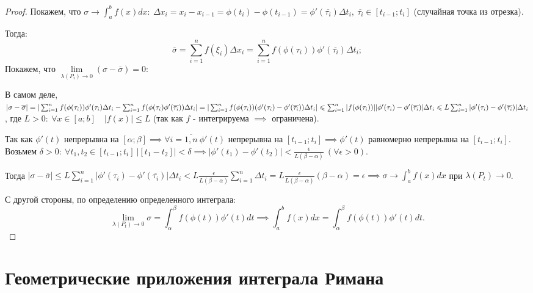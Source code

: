 \documentclass{report}
\theoremstyle{definition}
\begin{document}
\begin{proof}
  Покажем, что $\sigma \rightarrow \int_{a}^{b}f(x)dx: \ \Delta x_i = x_i - x_{i-1} = \phi(t_i)
    - \phi (t_{i-1}) = \phi'(\overline{\tau_i})\Delta t_i, \ \overline{\tau_i} \in [t_{i-1};t_i]$
  (случайная точка из отрезка).

  Тогда:
  \begin{equation*}
    \overline{\sigma} = \sum_{i=1}^{n}f(\xi_i)\Delta x_i = \sum_{i=1}^{n}f(\phi(\tau_i))
    \phi'(\overline{\tau_i})\Delta t_i;
  \end{equation*}
  Покажем, что $\underset{\lambda(P_i)\rightarrow0}{\lim}(\sigma - \overline{\sigma}) = 0:$

  В самом деле, $| \sigma - \overline{\sigma} | = | \sum_{i=1}^{n} f(\phi(\tau_i))\phi'(\tau_i)
    \Delta t_i - \sum_{i=1}^{n}f(\phi(\tau_i)\phi'(\overline{\tau_i}))\Delta t_i | =
    | \sum_{i=1}^{n}f(\phi(\tau_i))(\phi'(\tau_i) - \phi'(\overline{\tau_i}))\Delta t_i | \leqslant
    \sum_{i=1}^{n}| f(\phi(\tau_i)) | | \phi'(\tau_i) - \phi'(\overline{\tau_i}) |\Delta t_i \leqslant
    \\ L\sum_{i=1}^{n}| \phi'(\tau_i) - \phi'(\overline{\tau_i}) | \Delta t_i$, где $L>0: \ \forall x
    \in [a;b] \quad |f(x)| \leqslant L$ (так как $f$ - интегрируема $\implies$ ограничена).

  Так как $\phi'(t)$ непрерывна на $[\alpha;\beta] \implies \forall i = \overline{1,n} \
    \phi'(t)$ непрерывна на $[t_{i-1}; t_i] \implies \phi'(t)$ равномерно непрерывна на $[t_{i-1}; t_i]$.
  Возьмем $\delta > 0 : \ \forall t_1, t_2 \in [t_{i-1}; t_i] \ | [t_1 - t_2] | < \delta \implies
    | \phi'(t_1) - \phi'(t_2) | < \frac{\epsilon}{L(\beta - \alpha)} \ (\forall \epsilon > 0)$.

  Тогда $| \sigma - \overline{\sigma} | \leqslant L\sum_{i=1}^{n} | \phi'(\tau_i) - \phi'(\overline{
      \tau_i}) | \Delta t_i < L\frac{\epsilon}{L(\beta - \alpha)}\sum_{i=1}^{n}\Delta t_i = L
    \frac{\epsilon}{L(\beta - \alpha)}(\beta - \alpha) = \epsilon \implies \sigma \rightarrow
    \int_{a}^{b}f(x)dx$ при $\lambda(P_t) \rightarrow 0$.

  С другой стороны, по определению определенного интеграла:
  \begin{equation*}
    \underset{\lambda(P_t)\rightarrow0}{\lim}
    \sigma = \int_{\alpha}^{\beta}f(\phi(t))\phi'(t)dt \implies \int_{a}^{b}f(x)dx = \int_{\alpha}^{\beta}
    f(\phi(t))\phi'(t)dt.
  \end{equation*}
\end{proof}

\chapter{Геометрические приложения интеграла Римана}
\end{document}
